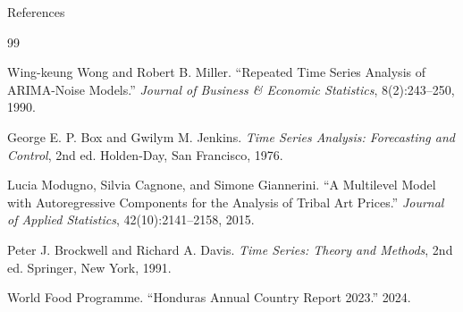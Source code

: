 \documentclass[9pt]{beamer}
\numberwithin{equation}{section}
\theoremstyle{plain}
\begin{document}
\begin{frame}{}
    \begin{block}{References}
    \begin{thebibliography}{99}



Wing-keung Wong and Robert B. Miller. ``Repeated Time Series Analysis of ARIMA-Noise Models.'' \textit{Journal of Business \& Economic Statistics}, 8(2):243--250, 1990.


George E. P. Box and Gwilym M. Jenkins. \textit{Time Series Analysis: Forecasting and Control}, 2nd ed. Holden-Day, San Francisco, 1976.





Lucia Modugno, Silvia Cagnone, and Simone Giannerini. ``A Multilevel Model with Autoregressive Components for the Analysis of Tribal Art Prices.'' \textit{Journal of Applied Statistics}, 42(10):2141--2158, 2015.

Peter J. Brockwell and Richard A. Davis. \textit{Time Series: Theory and Methods}, 2nd ed. Springer, New York, 1991.


World Food Programme. ``Honduras Annual Country Report 2023.'' 2024.



\end{thebibliography}
    \end{block}
\end{frame}
\end{document}
